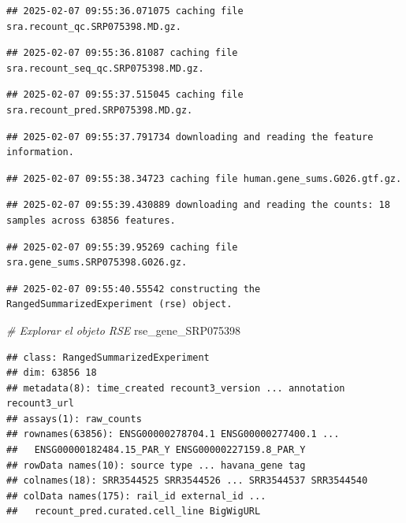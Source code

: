 \documentclass[
]{article}
\newenvironment{Shaded}{\begin{snugshade}}{\end{snugshade}}
\newcommand{\CommentTok}[1]{\textcolor[rgb]{0.56,0.35,0.01}{\textit{#1}}}
\newcommand{\NormalTok}[1]{#1}
\begin{document}
\begin{verbatim}
## 2025-02-07 09:55:36.071075 caching file sra.recount_qc.SRP075398.MD.gz.
\end{verbatim}

\begin{verbatim}
## 2025-02-07 09:55:36.81087 caching file sra.recount_seq_qc.SRP075398.MD.gz.
\end{verbatim}

\begin{verbatim}
## 2025-02-07 09:55:37.515045 caching file sra.recount_pred.SRP075398.MD.gz.
\end{verbatim}

\begin{verbatim}
## 2025-02-07 09:55:37.791734 downloading and reading the feature information.
\end{verbatim}

\begin{verbatim}
## 2025-02-07 09:55:38.34723 caching file human.gene_sums.G026.gtf.gz.
\end{verbatim}

\begin{verbatim}
## 2025-02-07 09:55:39.430889 downloading and reading the counts: 18 samples across 63856 features.
\end{verbatim}

\begin{verbatim}
## 2025-02-07 09:55:39.95269 caching file sra.gene_sums.SRP075398.G026.gz.
\end{verbatim}

\begin{verbatim}
## 2025-02-07 09:55:40.55542 constructing the RangedSummarizedExperiment (rse) object.
\end{verbatim}

\begin{Shaded}
\begin{Highlighting}[]
\CommentTok{\# Explorar el objeto RSE}
\NormalTok{rse\_gene\_SRP075398}
\end{Highlighting}
\end{Shaded}

\begin{verbatim}
## class: RangedSummarizedExperiment 
## dim: 63856 18 
## metadata(8): time_created recount3_version ... annotation recount3_url
## assays(1): raw_counts
## rownames(63856): ENSG00000278704.1 ENSG00000277400.1 ...
##   ENSG00000182484.15_PAR_Y ENSG00000227159.8_PAR_Y
## rowData names(10): source type ... havana_gene tag
## colnames(18): SRR3544525 SRR3544526 ... SRR3544537 SRR3544540
## colData names(175): rail_id external_id ...
##   recount_pred.curated.cell_line BigWigURL
\end{verbatim}
\end{document}
